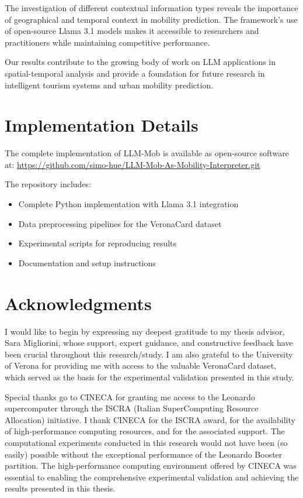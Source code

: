 \documentclass[12pt,a4paper]{article}
\begin{document}
The investigation of different contextual information types reveals the importance of geographical and temporal context in mobility prediction. The framework's use of open-source Llama 3.1 models makes it accessible to researchers and practitioners while maintaining competitive performance.

Our results contribute to the growing body of work on LLM applications in spatial-temporal analysis and provide a foundation for future research in intelligent tourism systems and urban mobility prediction.

\section{Implementation Details}

The complete implementation of LLM-Mob is available as open-source software at:
\url{https://github.com/simo-hue/LLM-Mob-As-Mobility-Interpreter.git}

The repository includes:
\begin{itemize}
\item Complete Python implementation with Llama 3.1 integration
\item Data preprocessing pipelines for the VeronaCard dataset
\item Experimental scripts for reproducing results
\item Documentation and setup instructions
\end{itemize}

\section{Acknowledgments}

I would like to begin by expressing my deepest gratitude to my thesis advisor, Sara Migliorini, whose support, expert guidance, and constructive feedback have been crucial throughout this research/study. I am also grateful to the University of Verona for providing me with access to the valuable VeronaCard dataset, which served as the basis for the experimental validation presented in this study.

Special thanks go to CINECA for granting me access to the Leonardo supercomputer through the ISCRA (Italian SuperComputing Resource Allocation) initiative. I thank CINECA for the ISCRA award, for the availability of high-performance computing resources, and for the associated support. The computational experiments conducted in this research would not have been (so easily) possible without the exceptional performance of the Leonardo Booster partition. The high-performance computing environment offered by CINECA was essential to enabling the comprehensive experimental validation and achieving the results presented in this thesis.
\end{document}
